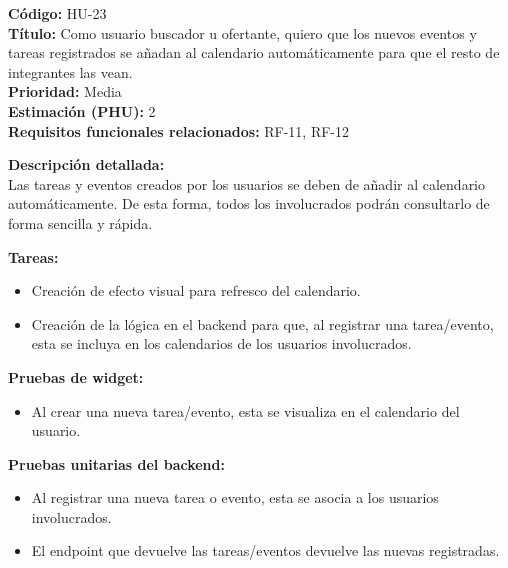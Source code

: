\begin{tarjetaHU}
\textbf{Código:} HU-23 \\
\textbf{Título:} Como usuario buscador u ofertante, quiero que los nuevos eventos y tareas registrados se añadan al calendario automáticamente para que el resto de integrantes las vean. \\
\textbf{Prioridad:} Media \\
\textbf{Estimación (PHU):} 2 \\
\textbf{Requisitos funcionales relacionados:} RF-11, RF-12

\vspace{0.5em}
\textbf{Descripción detallada:} \\
Las tareas y eventos creados por los usuarios se deben de añadir al calendario automáticamente. De esta forma, todos los involucrados podrán consultarlo de forma sencilla y rápida.

\vspace{0.5em}
\textbf{Tareas:}
\begin{itemize}[left=0pt]
  \item Creación de efecto visual para refresco del calendario.
  \item Creación de la lógica en el backend para que, al registrar una tarea/evento, esta se incluya en los calendarios de los usuarios involucrados.
\end{itemize}

\vspace{0.5em}
\textbf{Pruebas de widget:}
\begin{itemize}[left=0pt]
  \item Al crear una nueva tarea/evento, esta se visualiza en el calendario del usuario.
\end{itemize}
\textbf{Pruebas unitarias del backend:}
\begin{itemize}[left=0pt]
  \item Al registrar una nueva tarea o evento, esta se asocia a los usuarios involucrados.
  \item El endpoint que devuelve las tareas/eventos devuelve las nuevas registradas.
\end{itemize}
\end{tarjetaHU}


